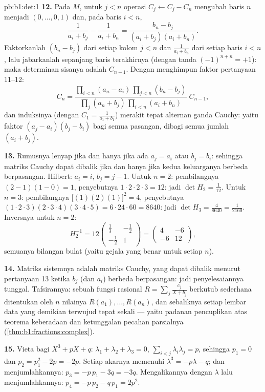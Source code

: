 \begin{solution}{pb:b1:det:1}
\textbf{12.} Pada $M$, untuk $j < n$ operasi $C_j \leftarrow
C_j - C_n$ mengubah baris $n$ menjadi $(0, \dots, 0, 1)$ dan, pada baris $i
< n$,
\[
\frac{1}{a_i + b_j} - \frac{1}{a_i + b_n}
= \frac{b_n - b_j}{(a_i + b_j)(a_i + b_n)} .
\]
Faktorkanlah $(b_n - b_j)$ dari setiap kolom $j < n$ dan $\frac1{a_i +
b_n}$ dari setiap baris $i < n$, lalu jabarkanlah sepanjang baris terakhirnya
(dengan tanda $(-1)^{n+n} = +1$): maka determinan sisanya adalah
$C_{n-1}$. Dengan menghimpun faktor pertanyaan 11--12:
\[
C_n = \frac{\prod_{i<n}(a_n - a_i)\,\prod_{j<n}(b_n - b_j)}
{\prod_{j}(a_n + b_j)\,\prod_{i<n}(a_i + b_n)}\;C_{n-1},
\]
dan induksinya (dengan  $C_1 = \frac1{a_1+b_1}$) merakit
tepat alternan ganda Cauchy: yaitu faktor $(a_j - a_i)(b_j
- b_i)$ bagi semua pasangan, dibagi semua jumlah $(a_i + b_j)$.

\textbf{13.} Rumusnya lenyap jika dan hanya jika ada $a_j = a_i$ atau $b_j =
b_i$: sehingga matriks Cauchy dapat dibalik jika dan hanya jika kedua keluarganya
berbeda berpasangan. Hilbert: $a_i = i$, $b_j = j - 1$. Untuk $n =
2$: pembilangnya $(2-1)(1-0) = 1$, penyebutnya $1\cdot2\cdot2\cdot3
= 12$: jadi $\det H_2 = \frac1{12}$. Untuk $n = 3$: pembilangnya
$\bigl[(1)(2)(1)\bigr]^2 = 4$, penyebutnya $(1\cdot2\cdot3)
(2\cdot3\cdot4)(3\cdot4\cdot5) = 6\cdot24\cdot60 = 8640$:
jadi $\det H_3 = \frac{4}{8640} = \frac1{2160}$. Inversnya untuk $n = 2$:
\[
H_2^{-1} = 12\begin{pmatrix} \frac13 & -\frac12\\[2pt]
-\frac12 & 1\end{pmatrix}
= \begin{pmatrix} 4 & -6\\ -6 & 12 \end{pmatrix},
\]
semuanya bilangan bulat (yaitu gejala yang benar untuk setiap $n$).

\textbf{14.} Matriks sistemnya adalah matriks Cauchy,
yang dapat dibalik menurut pertanyaan 13 ketika $b_j$ (dan $a_i$)
berbeda berpasangan: jadi penyelesaiannya tunggal. Tafsirannya: sebuah fungsi
rasional $R = \sum_j \frac{c_j}{X + b_j}$ berkutub sederhana
ditentukan oleh $n$ nilainya $R(a_1), \dots, R(a_n)$, dan
sebaliknya setiap lembar data yang demikian terwujud tepat sekali ---
yaitu padanan pencuplikan atas teorema keberadaan dan ketunggalan
pecahan parsialnya (\cref{thm:b1:fractions:complex}).

\textbf{15.} Vieta bagi $X^3 + pX + q$: $\lambda_1 + \lambda_2 +
\lambda_3 = 0$, $\sum_{i<j}\lambda_i\lambda_j = p$, sehingga $p_1 = 0$
dan $p_2 = p_1^2 - 2p = -2p$. Setiap akarnya memenuhi $\lambda^3 =
-p\lambda - q$; dan menjumlahkannya: $p_3 = -p\,p_1 - 3q = -3q$. Mengalikannya
dengan $\lambda$ lalu menjumlahkannya: $p_4 = -p\,p_2 - q\,p_1 = 2p^2$.


\end{solution}
